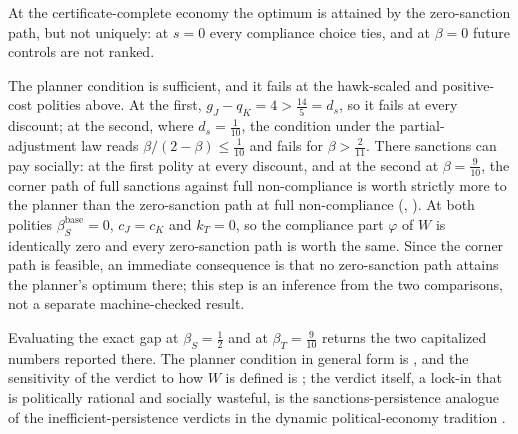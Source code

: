 At the certificate-complete economy the optimum is attained by the
zero-sanction path, but not uniquely: at
\(s=0\) every compliance choice ties, and at \(\beta=0\) future controls are
not ranked.

The planner condition is sufficient, and it fails at the hawk-scaled and
positive-cost polities above. At the first, $g_J-q_K=4>\tfrac{14}5=d_s$, so it
fails at every discount; at the second, where $d_s=\tfrac1{10}$, the condition under the
partial-adjustment law reads $\beta/(2-\beta)\le\tfrac1{10}$ and fails for
$\beta>\tfrac2{11}$. There sanctions can pay socially: at the first polity at
every discount, and at the second at $\beta=\tfrac9{10}$, the corner path of full sanctions against full
non-compliance is worth strictly more to the planner than the zero-sanction path at
full non-compliance (,
). At both polities
$\beta^{\mathrm{base}}_S=0$, $c_J=c_K$ and $k_T=0$, so the compliance part
$\varphi$ of $W$ is identically zero and every zero-sanction path is worth the
same. Since the corner path is feasible, an immediate consequence is that no
zero-sanction path attains the planner's optimum there; this step is an
inference from the two comparisons, not a separate machine-checked result.

Evaluating the exact gap at $\beta_S=\tfrac12$ and at
$\beta_T=\tfrac9{10}$ returns the two capitalized numbers reported
there. The planner condition in general form is
, and the sensitivity of the verdict to how $W$
is defined is ; the verdict itself, a
lock-in that is politically rational and socially wasteful, is the
sanctions-persistence analogue of the inefficient-persistence verdicts in
the dynamic political-economy tradition
\citep{AcemogluRobinson2008,BattagliniCoate2008,HasslerEtAl2003}.

